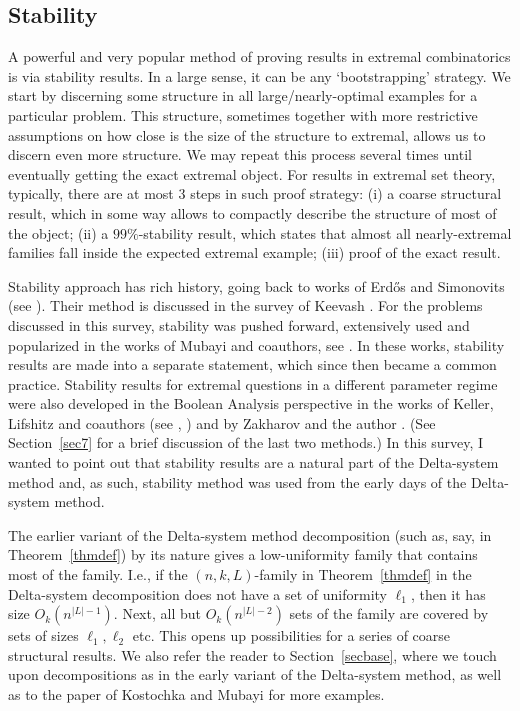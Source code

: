 \documentclass[graybox]{svmult}
\begin{document}
\subsection{Stability} A powerful and very popular method of proving results in extremal combinatorics is via stability results. In a large sense, it can be any `bootstrapping' strategy. We start by discerning some structure in all large/nearly-optimal examples for a particular problem. This structure, sometimes together with more restrictive assumptions on how close is the size of the structure to extremal, allows us to discern even more structure. We may repeat this process several times until eventually getting the exact extremal object. For results in extremal set theory, typically, there are at most $3$ steps in such proof strategy:  (i) a coarse structural result, which in some way allows to compactly describe the structure of most of the object; (ii) a $99\%$-stability result, which states that almost all nearly-extremal families fall inside the expected extremal example; (iii) proof of the exact result.


Stability approach has rich history, going back to works of Erd\H os and Simonovits (see \cite{Simo}). Their method is discussed in the survey of Keevash \cite{Kee2}.  For the problems discussed in this survey, stability was pushed forward, extensively used and popularized in the works of Mubayi and coauthors, see \cite{MV}. In these works, stability results are made into a separate statement, which since then became a common practice. Stability results for extremal questions in a different parameter regime were also developed in the Boolean Analysis perspective in the works of Keller, Lifshitz and coauthors (see \cite{KL}, \cite{EKL}) and by Zakharov and the author \cite{KuZa}. (See Section~\ref{sec7} for a brief discussion of the last two methods.) In this survey, I wanted to point out that stability results are a natural part of the Delta-system method and, as such, stability method was used from the early days of the Delta-system method.

The earlier variant of the Delta-system method decomposition (such as, say, in Theorem~\ref{thmdef}) by its nature gives a low-uniformity family that contains most of the family. I.e., if the $(n,k,L)$-family in Theorem~\ref{thmdef} in the Delta-system decomposition does not have a set of uniformity $\ell_1$, then it has size $O_k(n^{|L|-1})$. Next, all but $O_k(n^{|L|-2})$ sets of the family are covered by sets of sizes $\ell_1,\ell_2$ etc. This opens up possibilities for a series of coarse structural results.  We also refer the reader to Section~\ref{secbase}, where we touch upon decompositions as in the early variant of the Delta-system method, as well as to the paper of Kostochka and Mubayi \cite{KM2} for more examples.
\end{document}

